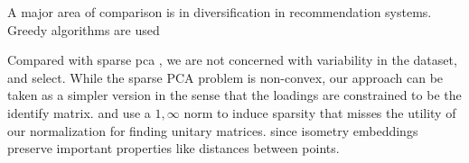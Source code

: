 


A major area of comparison is in diversification in recommendation systems.  Greedy algorithms are used \cite{Carbonell2017-gi, Wu2019-uk}

Compared with sparse pca \cite{Bertsimas2022-qo, Bertsimas2022-dv}, we are not concerned with variability in the dataset, and select.
While the sparse PCA problem is non-convex, our approach can be taken as a simpler version in the sense that the loadings are constrained to be the identify matrix.
\cite{Tropp06-sg} and \cite{Liu2009-yo} use a $1,\infty$ norm to induce sparsity that misses the utility of our normalization for finding unitary matrices.
since isometry embeddings preserve important properties like distances between points.

